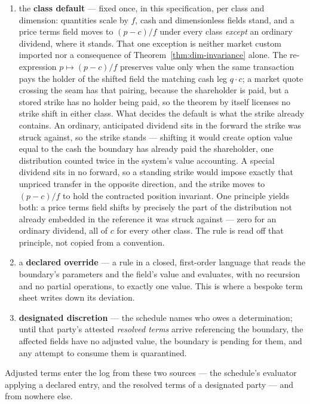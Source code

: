 \begin{enumerate}[leftmargin=1.5em]
\item the \textbf{class default} --- fixed once, in this specification, per class
and dimension: quantities scale by $f$, cash and dimensionless fields stand, and a
price terms field moves to $(p-c)/f$ under every class \emph{except} an ordinary
dividend, where it stands. That one exception is neither market custom imported nor a
consequence of Theorem~\ref{thm:dim-invariance} alone. The re-expression
$p \mapsto (p-c)/f$ preserves value only when the same transaction pays the holder of
the shifted field the matching cash leg $q \cdot c$; a market quote crossing the seam
has that pairing, because the shareholder is paid, but a stored strike has no holder
being paid, so the theorem by itself licenses no strike shift in either class. What
decides the default is what the strike already contains. An ordinary, anticipated
dividend sits in the forward the strike was struck against, so the strike stands ---
shifting it would create option value equal to the cash the boundary has already paid
the shareholder, one distribution counted twice in the system's value accounting. A
special dividend sits in no forward, so a standing strike would impose exactly that
unpriced transfer in the opposite direction, and the strike moves to $(p-c)/f$ to hold
the contracted position invariant. One principle yields both: a price terms field
shifts by precisely the part of the distribution not already embedded in the reference
it was struck against --- zero for an ordinary dividend, all of $c$ for every other
class. The rule is read off that principle, not copied from a convention.
\item a \textbf{declared override} --- a rule in a closed, first-order language
that reads the boundary's parameters and the field's value and evaluates, with no
recursion and no partial operations, to exactly one value. This is where a
bespoke term sheet writes down its deviation.
\item \textbf{designated discretion} --- the schedule names who owes a
determination; until that party's attested \emph{resolved terms} arrive
referencing the boundary, the affected fields have no adjusted value, the boundary
is pending for them, and any attempt to consume them is quarantined.
\end{enumerate}

Adjusted terms enter the log from these two sources --- the schedule's evaluator
applying a declared entry, and the resolved terms of a designated party --- and
from nowhere else.

